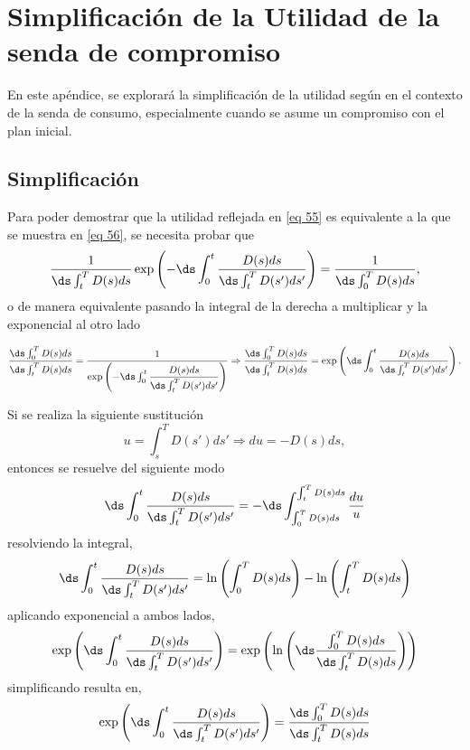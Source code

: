 \chapter{Simplificación de la Utilidad de la senda de compromiso}\label{Apendice_E}

En este apéndice, se explorará la simplificación de la utilidad según \parencite{feigenbaum2021deviation} en el contexto de la senda de consumo, especialmente cuando se asume un compromiso con el plan inicial. 

\section{Simplificación}
Para poder demostrar que la utilidad reflejada en \ref{eq 55} es equivalente a la que se muestra en \ref{eq 56}, se necesita probar que 
\begin{equation}
    \label{ap_e 1}
    \dfrac{1}{\ds \int_t^T D(s)ds} \exp \left(- \ds \int_0^t \dfrac{D(s)ds}{\ds \int_t^T D(s')ds'} \right)= \dfrac{1}{\ds \int_0^T D(s)ds},
\end{equation}
o de manera equivalente pasando la integral de la derecha a multiplicar y la exponencial al otro lado

$$\dfrac{\ds \int_0^T D(s)ds}{\ds \int_t^T D(s)ds} = \dfrac{1}{\exp \left(- \ds \int_0^t \dfrac{D(s)ds}{\ds \int_t^T D(s')ds'} \right)} \Rightarrow
\dfrac{\ds \int_0^T D(s)ds}{\ds \int_t^T D(s)ds} = \exp \left( \ds \int_0^t \dfrac{D(s)ds}{\ds \int_t^T D(s')ds'} \right).$$

Si se realiza la siguiente sustitución 
$$u=\int_s^TD(s')ds' \Rightarrow
du=-D(s)ds,$$
entonces se resuelve del siguiente modo
$$\ds \int_0^t \dfrac{D(s)ds}{\ds \int_t^T D(s')ds'}= - \ds \int_{ \int_0^T D(s)ds}^{ \int_t^T D(s)ds} \dfrac{du}{u}$$
resolviendo la integral,
$$\ds \int_0^t \dfrac{D(s)ds}{\ds \int_t^T D(s')ds'}= \ln \left( \int_0^T D(s)ds\right) - \ln \left( \int_t^T D(s)ds\right)$$
aplicando exponencial a ambos lados,
$$\exp \left(\ds \int_0^t \dfrac{D(s)ds}{\ds \int_t^T D(s')ds'}\right)=\exp \left( \ln \left( \ds \dfrac{\int_0^T D(s)ds}{\ds \int_t^T D(s)ds} \right) \right)$$
simplificando resulta en,
$$\exp \left(\ds \int_0^t \dfrac{D(s)ds}{\ds \int_t^T D(s')ds'}\right)=\dfrac{\ds \int_0^T D(s)ds}{ \ds \int_t^T D(s)ds}$$